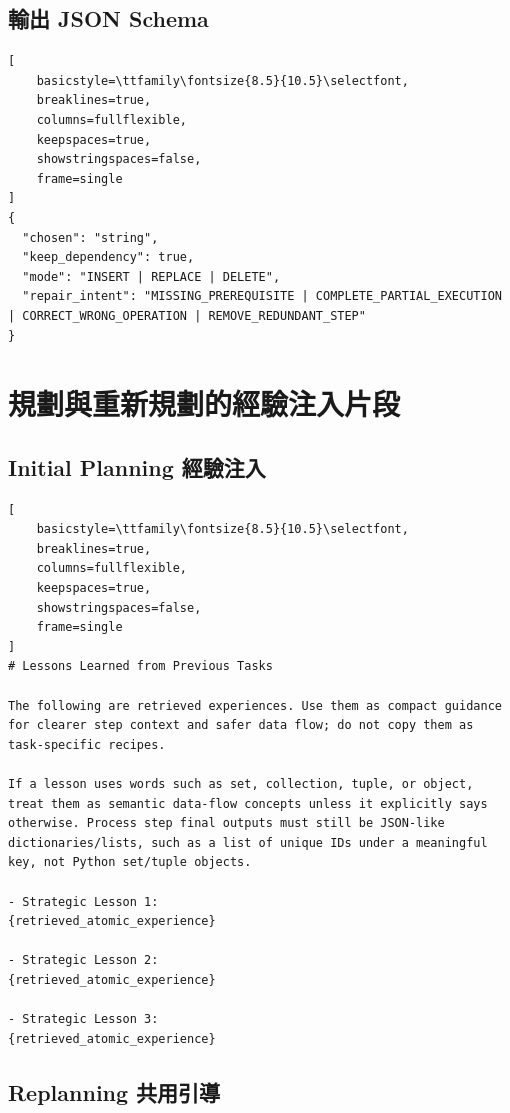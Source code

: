 \subsection*{輸出 JSON Schema}

\begin{lstlisting}[
    basicstyle=\ttfamily\fontsize{8.5}{10.5}\selectfont,
    breaklines=true,
    columns=fullflexible,
    keepspaces=true,
    showstringspaces=false,
    frame=single
]
{
  "chosen": "string",
  "keep_dependency": true,
  "mode": "INSERT | REPLACE | DELETE",
  "repair_intent": "MISSING_PREREQUISITE | COMPLETE_PARTIAL_EXECUTION | CORRECT_WRONG_OPERATION | REMOVE_REDUNDANT_STEP"
}
\end{lstlisting}

\section{規劃與重新規劃的經驗注入片段}
\label{app:planning-replanning-experience-injection}

\subsection*{Initial Planning 經驗注入}

\begin{lstlisting}[
    basicstyle=\ttfamily\fontsize{8.5}{10.5}\selectfont,
    breaklines=true,
    columns=fullflexible,
    keepspaces=true,
    showstringspaces=false,
    frame=single
]
# Lessons Learned from Previous Tasks

The following are retrieved experiences. Use them as compact guidance for clearer step context and safer data flow; do not copy them as task-specific recipes.

If a lesson uses words such as set, collection, tuple, or object, treat them as semantic data-flow concepts unless it explicitly says otherwise. Process step final outputs must still be JSON-like dictionaries/lists, such as a list of unique IDs under a meaningful key, not Python set/tuple objects.

- Strategic Lesson 1:
{retrieved_atomic_experience}

- Strategic Lesson 2:
{retrieved_atomic_experience}

- Strategic Lesson 3:
{retrieved_atomic_experience}
\end{lstlisting}

\subsection*{Replanning 共用引導}


